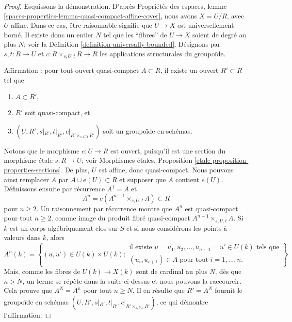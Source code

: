 \begin{proof}
Esquissons la démonstration. D'après
Propriétés des espaces, lemme
\ref{spaces-properties-lemma-quasi-compact-affine-cover},
nous avons $X = U/R$, avec $U$ affine.
Dans ce cas, être raisonnable signifie que $U \to X$ est
universellement borné. Il existe donc un entier $N$ tel que les ``fibres'' de
$U \to X$ soient de degré au plus $N$; voir la
Définition \ref{definition-universally-bounded}.
Désignons par $s, t : R \to U$ et $c : R \times_{s, U, t} R \to R$ les
applications structurales du groupoïde.

\medskip\noindent
Affirmation : pour tout ouvert quasi-compact $A \subset R$, il existe un ouvert
$R' \subset R$ tel que
\begin{enumerate}
\item $A \subset R'$,
\item $R'$ soit quasi-compact, et
\item $(U, R', s|_{R'}, t|_{R'}, c|_{R' \times_{s, U, t} R'})$ soit
un groupoïde en schémas.
\end{enumerate}
Notons que le morphisme $e : U \to R$ est ouvert, puisqu'il est une section du
morphisme étale $s : R \to U$; voir
\'Morphismes étales, Proposition \ref{etale-proposition-properties-sections}.
De plus, $U$ est affine, donc quasi-compact. Nous pouvons ainsi remplacer $A$
par $A \cup e(U) \subset R$ et supposer que $A$ contient $e(U)$. Définissons
ensuite par récurrence $A^1 = A$ et
$$
A^n = c(A^{n - 1} \times_{s, U, t} A) \subset R
$$
pour $n \geq 2$. Un raisonnement par récurrence montre que $A^n$ est
quasi-compact pour tout $n \geq 2$, comme image du produit fibré quasi-compact
$A^{n - 1} \times_{s, U, t} A$. Si $k$ est un corps algébriquement clos sur
$S$ et si nous considérons les points à valeurs dans $k$, alors
$$
A^n(k) = \left\{(u, u') \in U(k) \times U(k)
:
\begin{matrix}
\text{il existe } u = u_1, u_2, \ldots, u_{n + 1} = u' \in U(k)
\text{ tels que} \\
(u_i , u_{i + 1}) \in A \text{ pour tout }i = 1, \ldots, n.
\end{matrix}
\right\}
$$
Mais, comme les fibres de $U(k) \to X(k)$ sont de cardinal au plus $N$, dès
que $n > N$, un terme se répète dans la suite ci-dessus et nous pouvons la
raccourcir. Cela prouve que $A^N = A^n$ pour tout $n \geq N$.
Il en résulte que $R' = A^N$ fournit le groupoïde en schémas
$(U, R', s|_{R'}, t|_{R'}, c|_{R' \times_{s, U, t} R'})$, ce qui démontre
l'affirmation.


\end{proof}
